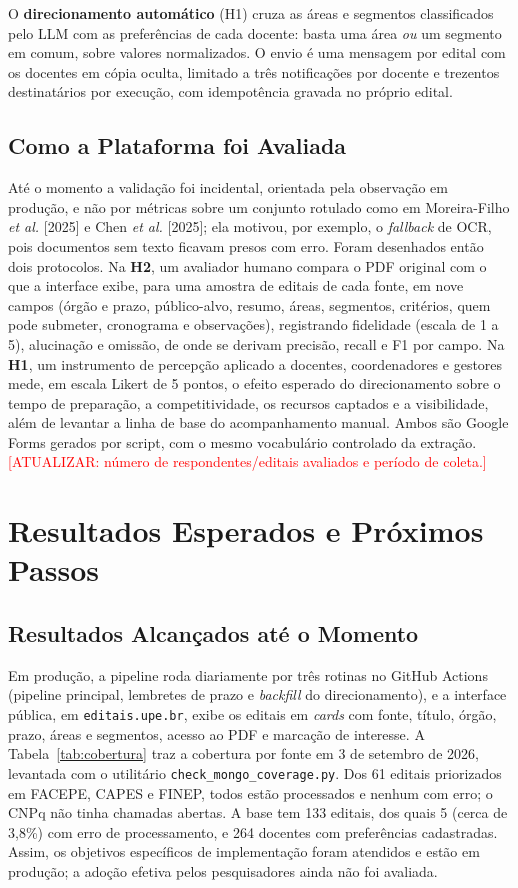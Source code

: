 \documentclass[12pt]{article}
\begin{document}
  O \textbf{direcionamento automático} (H1) cruza as áreas e segmentos classificados pelo LLM com as preferências de cada docente: basta uma área \emph{ou} um segmento em comum, sobre valores normalizados. O envio é uma mensagem por edital com os docentes em cópia oculta, limitado a três notificações por docente e trezentos destinatários por execução, com idempotência gravada no próprio edital.

  \subsection{Como a Plataforma foi Avaliada}\label{sec:como-a-plataforma-foi-avaliada}
  Até o momento a validação foi incidental, orientada pela observação em produção, e não por métricas sobre um conjunto rotulado como em Moreira-Filho \emph{et al.} [2025] e Chen \emph{et al.} [2025]; ela motivou, por exemplo, o \emph{fallback} de OCR, pois documentos sem texto ficavam presos com erro. Foram desenhados então dois protocolos. Na \textbf{H2}, um avaliador humano compara o PDF original com o que a interface exibe, para uma amostra de editais de cada fonte, em nove campos (órgão e prazo, público-alvo, resumo, áreas, segmentos, critérios, quem pode submeter, cronograma e observações), registrando fidelidade (escala de 1 a 5), alucinação e omissão, de onde se derivam precisão, recall e F1 por campo. Na \textbf{H1}, um instrumento de percepção aplicado a docentes, coordenadores e gestores mede, em escala Likert de 5 pontos, o efeito esperado do direcionamento sobre o tempo de preparação, a competitividade, os recursos captados e a visibilidade, além de levantar a linha de base do acompanhamento manual. Ambos são Google Forms gerados por script, com o mesmo vocabulário controlado da extração. \textcolor{red}{[ATUALIZAR: número de respondentes/editais avaliados e período de coleta.]}

  \section{Resultados Esperados e Próximos Passos}\label{sec:resultados}

  \subsection{Resultados Alcançados até o Momento}
  Em produção, a pipeline roda diariamente por três rotinas no GitHub Actions (pipeline principal, lembretes de prazo e \emph{backfill} do direcionamento), e a interface pública, em \texttt{editais.upe.br}, exibe os editais em \emph{cards} com fonte, título, órgão, prazo, áreas e segmentos, acesso ao PDF e marcação de interesse. A Tabela~\ref{tab:cobertura} traz a cobertura por fonte em 3 de setembro de 2026, levantada com o utilitário \texttt{check\_mongo\_coverage.py}. Dos 61 editais priorizados em FACEPE, CAPES e FINEP, todos estão processados e nenhum com erro; o CNPq não tinha chamadas abertas. A base tem 133 editais, dos quais 5 (cerca de 3,8\%) com erro de processamento, e 264 docentes com preferências cadastradas. Assim, os objetivos específicos de implementação foram atendidos e estão em produção; a adoção efetiva pelos pesquisadores ainda não foi avaliada.
\end{document}

